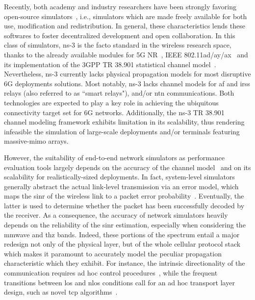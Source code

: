 Recently, both academy and industry researchers have been strongly favoring open-source simulators~\cite{10465179}, i.e., simulators which are made freely available for both use, modification and redistribution. In general, these characteristics lends these softwares to foster decentralized development and open collaboration.
In this class of simulators, ns-3 is the facto standard in the wireless research space, 
thanks to the already available modules for 5G NR~\cite{mezzavilla2018end, patriciello2019e2e}, IEEE 802.11ad/ay/ax~\cite{magrinValid2021, 10.1145/3460797.3460799, 7461452} and its implementation of the 3GPP TR 38.901 statistical channel model~\cite{zugno2020implementation}.
Nevertheless, ns-3 currently lacks physical propagation models for most disruptive 6G deployments solutions. Most notably, ns-3 lacks channel models for \gls{af} and \glspl{irs} relays (also referred to as ``smart relays"), and/or \gls{ntn} communications. Both technologies are expected to play a key role in achieving the ubiquitous connectivity target set for 6G networks.
Additionally, the ns-3 TR 38.901~\cite{3gpp.38.901} channel modeling framework exhibits limitation in its scalability, thus rendering infeasible the simulation of large-scale deployments and/or terminals featuring massive-\gls{mimo} arrays.

However, the suitability of end-to-end network simulators as performance evaluation tools largely depends on the accuracy of the channel model~\cite{testolina2020scalable} and on its scalability for realistically-sized deployments.
In fact, system-level simulators generally abstract the actual link-level transmission via an error model, which maps the \gls{sinr} of the wireless link to a packet error probability~\cite{lagen2020new}. Eventually, the latter is used to determine whether the packet has been successfully decoded by the receiver. As a consequence, the accuracy of network simulators heavily depends on the reliability of the \gls{sinr} estimation, especially when considering the \gls{mmwave} and \gls{thz} bands. Indeed, these portions of the spectrum entail a major redesign not only of the physical layer, but of the whole cellular protocol stack~\cite{shafi2018microwave} which makes it paramount to accurately model the peculiar propagation characteristic which they exhibit. For instance, the intrinsic directionality of the communication requires ad hoc control procedures~\cite{heng2021six}, while the frequent transitions between \gls{los} and \gls{nlos} conditions call for an ad hoc transport layer design, such as novel \gls{tcp} algorithms~\cite{zhang2019will}.

